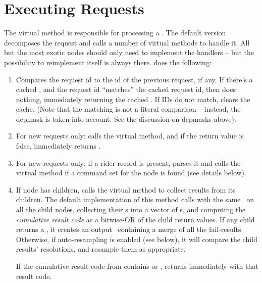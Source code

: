 \chapter{Executing Requests}

  The virtual  method is responsible for processing a
  \Request. The default version decomposes the request and calls a number of
  virtual methods to handle it. All but the most exotic nodes should only need
  to implement the handlers -- but the possibility to reimplement
   itself is always there.  does the
  following:

  \begin{enumerate}
  
  \item Compares the request id to the id of the previous request, if any. If
    there's a cached \Result, and the request id ``matches'' the cached request
    id, then does nothing, immediately returning the cached \Result.  If IDs do
    not match, clears the cache. (Note that the matching is not a literal
    comparison -- instead, the depmask is taken into account. See the discussion
    on depmasks above).

  \item For new requests only: calls the virtual  method,
    and if the return value is false, immediately returns .

  \item For new requests only: if a rider record is present, parses it and 
    calls the virtual  method if a command set for the
    node is found (see details below).

  \item If node has children, calls the virtual  method to
    collect results from its children. The default implementation of this
    method calls  with the same \Request\ on all the child nodes,
    collecting their \Result{}s into a vector of s, and
    computing the {\em cumulative result code} as a bitwise-OR of the child
    return values. If any child returns a , it creates an output
    \Result\ containing a merge of all the fail-results. Otherwise, if
    auto-resampling is enabled (see below), it will compare the child results'
    resolutions, and resample them as appropriate.

    If the cumulative result code from  contains 
    or ,  returns immediately with that result code.  


\end{enumerate}
